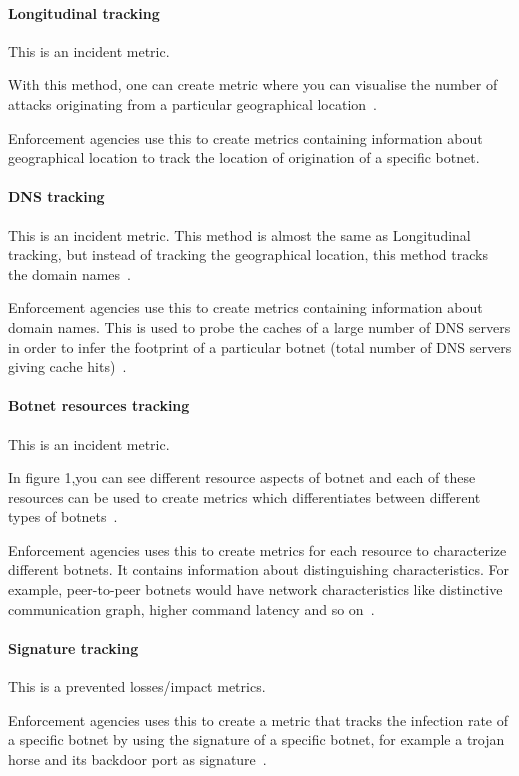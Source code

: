 \paragraph{Longitudinal tracking}
This is an incident metric.

With this method, one can create metric where you can visualise the number of attacks originating from a particular geographical location~\cite{AM2006}.

Enforcement agencies use this to create metrics containing information about geographical location to track the location of origination of a specific botnet.

\paragraph{DNS tracking}
This is an incident metric.
This method is almost the same as Longitudinal tracking, but instead of tracking the geographical location, this method tracks the domain names~\cite{AM2006}.

Enforcement agencies use this to create metrics containing information about domain names. This is used to probe the caches of a large number of DNS servers in order to infer the footprint of a particular botnet (total number of DNS servers giving cache hits)~\cite{AM2006}.

\paragraph{Botnet resources tracking}
This is an incident metric.

In figure 1,you can see different resource aspects of botnet and each of these resources can be used to create metrics which differentiates between different types of botnets~\cite{GJ2007}.

Enforcement agencies uses this to create metrics for each resource to characterize different botnets. It contains information about distinguishing characteristics. For example, peer-to-peer botnets would have network characteristics like distinctive communication graph, higher command latency and so on~\cite{GJ2007}.

\paragraph{Signature tracking}
This is a prevented losses/impact metrics.

Enforcement agencies uses this to create a metric that tracks the infection rate of a specific botnet by using the
signature of a specific botnet, for example a trojan horse and its backdoor port as signature~\cite{AM2005}.









